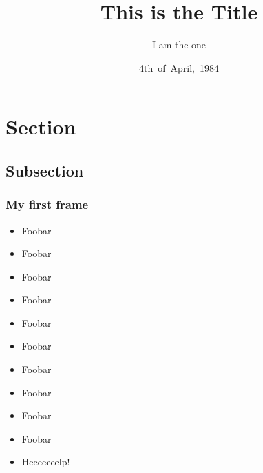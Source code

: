 \documentclass[compress]{beamer}
\title[short title]{%
    This is the Title
}
\author[Me]{%
    I am the one
}
\institute{
    From \ldots here
}
\date[short date]{\footnotesize{4th~of~April,~1984}}
\begin{document}
\begin{frame}
    \titlepage
\end{frame}


\section{Section}
\subsection{Subsection} 

\begin{frame}\frametitle{My first frame}
    \begin{itemize}
        \item Foobar
        \item Foobar
        \item Foobar
        \item Foobar
        \item Foobar
        \item Foobar
        \item Foobar
        \item Foobar
        \item Foobar
        \item Foobar
        \item Heeeeeeelp!
    \end{itemize}
\end{frame}
\end{document}
